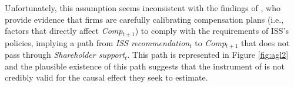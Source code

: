 \documentclass[12pt,reqno,titlepage]{amsart}
\theoremstyle{definition}
\begin{document}
Unfortunately, this assumption seems inconsistent with the findings of \citet{Gow:2013aa}, who provide evidence that firms are carefully calibrating compensation plans (i.e., factors that directly affect \textit{Comp}$_{t+1}$) to comply with the requirements of ISS's policies, implying a path from \textit{ISS recommendation}$_t$ to \textit{Comp}$_{t+1}$ that does not pass through \textit{Shareholder support}$_{t}$.
This path is represented in Figure \ref{fig:agl2} and the plausible existence of this path suggests that the instrument of \citet[p.\,912]{Armstrong:2013io} is not credibly valid for the causal effect they seek to estimate.
\end{document}
